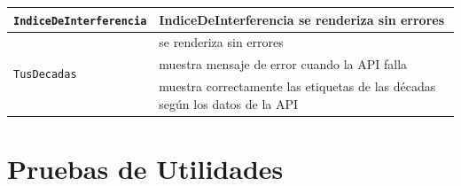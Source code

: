 \begin{longtable}{|p{5cm}|p{9cm}|}
  \multirow{1}{*}{\texttt{IndiceDeInterferencia}} & IndiceDeInterferencia se renderiza sin errores                               \\ \hline

  \multirow{3}{*}{\texttt{TusDecadas}}            & se renderiza sin errores                                                     \\ \cline{2-2}
                                                  & muestra mensaje de error cuando la API falla                                 \\ \cline{2-2}
                                                  & muestra correctamente las etiquetas de las décadas según los datos de la API \\ \hline
\end{longtable}

\section{Pruebas de Utilidades}

